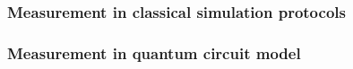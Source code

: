 \subsubsection{Measurement in classical simulation protocols}
\subsubsection{Measurement in quantum circuit model}